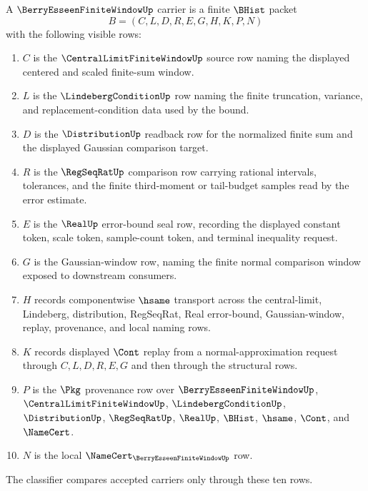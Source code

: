 \begin{definition}
\label{def:berry-esseen-finite-window-carrier}
A $\BerryEsseenFiniteWindowUp$ carrier is a finite $\BHist$ packet
$$
B=(C,L,D,R,E,G,H,K,P,N)
$$
with the following visible rows:
\begin{enumerate}
\item $C$ is the $\CentralLimitFiniteWindowUp$ source row naming the displayed centered and scaled finite-sum window.
\item $L$ is the $\LindebergConditionUp$ row naming the finite truncation, variance, and replacement-condition data used by the bound.
\item $D$ is the $\DistributionUp$ readback row for the normalized finite sum and the displayed Gaussian comparison target.
\item $R$ is the $\RegSeqRatUp$ comparison row carrying rational intervals, tolerances, and the finite third-moment or tail-budget samples read by the error estimate.
\item $E$ is the $\RealUp$ error-bound seal row, recording the displayed constant token, scale token, sample-count token, and terminal inequality request.
\item $G$ is the Gaussian-window row, naming the finite normal comparison window exposed to downstream consumers.
\item $H$ records componentwise $\hsame$ transport across the central-limit, Lindeberg, distribution, RegSeqRat, Real error-bound, Gaussian-window, replay, provenance, and local naming rows.
\item $K$ records displayed $\Cont$ replay from a normal-approximation request through $C,L,D,R,E,G$ and then through the structural rows.
\item $P$ is the $\Pkg$ provenance row over $\BerryEsseenFiniteWindowUp$, $\CentralLimitFiniteWindowUp$, $\LindebergConditionUp$, $\DistributionUp$, $\RegSeqRatUp$, $\RealUp$, $\BHist$, $\hsame$, $\Cont$, and $\NameCert$.
\item $N$ is the local $\NameCert_{\BerryEsseenFiniteWindowUp}$ row.
\end{enumerate}
The classifier compares accepted carriers only through these ten rows.
\end{definition}

